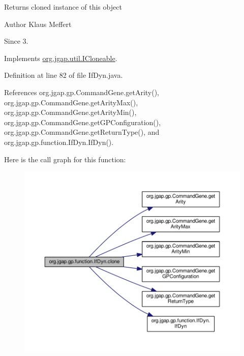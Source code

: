 \begin{DoxyReturn}{Returns}
cloned instance of this object
\end{DoxyReturn}
\begin{DoxyAuthor}{Author}
Klaus Meffert 
\end{DoxyAuthor}
\begin{DoxySince}{Since}
3. 
\end{DoxySince}


Implements \hyperlink{interfaceorg_1_1jgap_1_1util_1_1_i_cloneable_aa7e7d62077e6428ad7904932b1b4f7d5}{org.\-jgap.\-util.\-I\-Cloneable}.



Definition at line 82 of file If\-Dyn.\-java.



References org.\-jgap.\-gp.\-Command\-Gene.\-get\-Arity(), org.\-jgap.\-gp.\-Command\-Gene.\-get\-Arity\-Max(), org.\-jgap.\-gp.\-Command\-Gene.\-get\-Arity\-Min(), org.\-jgap.\-gp.\-Command\-Gene.\-get\-G\-P\-Configuration(), org.\-jgap.\-gp.\-Command\-Gene.\-get\-Return\-Type(), and org.\-jgap.\-gp.\-function.\-If\-Dyn.\-If\-Dyn().



Here is the call graph for this function\-:
\nopagebreak
\begin{figure}[H]
\begin{center}
\leavevmode
\includegraphics[width=350pt]{classorg_1_1jgap_1_1gp_1_1function_1_1_if_dyn_a75f5e475053cc10430f6f5dc03611ba0_cgraph}
\end{center}
\end{figure}


